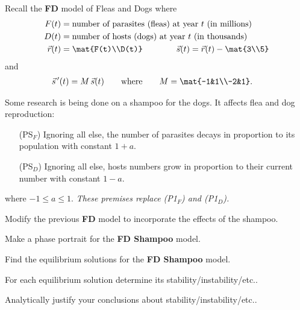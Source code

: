 \documentclass{workbook}
\begin{document}
\begin{slide}
	\question
 		Recall the \textbf{FD} model of Fleas and Dogs where 
	\begin{align*}
		F(t) &= \text{number of parasites (fleas) at year $t$ (in millions)}\\
		D(t) &= \text{number of hosts (dogs) at year $t$ (in thousands)}\\
		\vec r(t) &= \mat{F(t)\\D(t)} \qquad\qquad
		\vec s(t) = \vec r(t) - \mat{3\\5}
	\end{align*}
	and
	\begin{align*}
		\vec s\,'(t) &= M\,\vec s(t)\qquad\text{where}\qquad M=\mat{-1&1\\-2&1}.
	\end{align*}

	Some research is being done on a shampoo for the dogs. It affects flea and dog reproduction:
	\begin{itemize}
		\item[(PS$_F$)] Ignoring all else, the number of parasites decays in proportion to its population with constant $1+a$.
		\item[(PS$_D$)] Ignoring all else, hosts numbers grow in proportion to their current number with constant $1-a$.
	\end{itemize}
	
	\vspace{-1.5em}
	where $-1\leq a\leq 1$. \emph{These premises replace (P1$_F$) and (P1$_D$).}
	
	\begin{parts}
		\item Modify the previous \textbf{FD} model to incorporate the effects of the shampoo.
		\item Make a phase portrait for the \textbf{FD Shampoo} model.
		\item Find the equilibrium solutions for the \textbf{FD Shampoo} model.
		\item For each equilibrium solution determine its stability/instability/etc..
		\item Analytically justify your conclusions about stability/instability/etc..
	\end{parts}
\end{slide}
\end{document}
